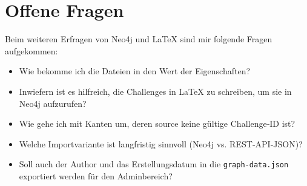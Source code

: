 \section{Offene Fragen}

Beim weiteren Erfragen von Neo4j und LaTeX sind mir folgende Fragen aufgekommen:

\begin{itemize}
\item Wie bekomme ich die Dateien in den Wert der Eigenschaften? 
\item Inwiefern ist es hilfreich, die Challenges in LaTeX zu schreiben, um sie in Neo4j aufzurufen? 
\item Wie gehe ich mit Kanten um, deren source keine gültige Challenge‑ID ist? 
\item Welche Importvariante ist langfristig sinnvoll (Neo4j vs. REST‑API‑JSON)? 
\item Soll auch der Author und das Erstellungsdatum in die \texttt{graph-data.json} exportiert werden für den Adminbereich? 
\end{itemize}
